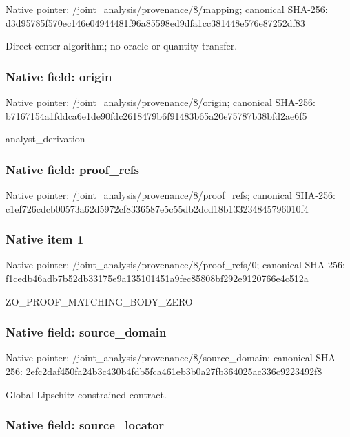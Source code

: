 \documentclass[10pt,a4paper]{article}
\begin{document}
Native pointer: /joint\_analysis/provenance/8/mapping; canonical SHA-256: d3d95785f570ec146e049444\allowbreak{}81f96a85598ed9dfa1cc3814\allowbreak{}48e576e87252df83


Direct center algorithm; no oracle or quantity transfer.


\subsubsection{Native field: origin}


Native pointer: /joint\_analysis/provenance/8/origin; canonical SHA-256: b7167154a1fddca6e1de90fd\allowbreak{}c2618479b6f91483b65a20e7\allowbreak{}5787b38bfd2ae6f5


analyst\_derivation


\subsubsection{Native field: proof\_refs}


Native pointer: /joint\_analysis/provenance/8/proof\_refs; canonical SHA-256: c1ef726cdcb00573a62d5972\allowbreak{}cf8336587e5c55db2dcd18b1\allowbreak{}33234845796010f4



\subsubsection{Native item 1}


Native pointer: /joint\_analysis/provenan\allowbreak{}ce/8/proof\_refs/0; canonical SHA-256: f1cedb46adb7b52db33175e9\allowbreak{}a135101451a9fec85808bf29\allowbreak{}2e9120766e4c512a


ZO\_PROOF\_MATCHING\_BODY\_ZERO


\subsubsection{Native field: source\_domain}


Native pointer: /joint\_analysis/provenan\allowbreak{}ce/8/source\_domain; canonical SHA-256: 2efc2daf450fa24b3c430b4f\allowbreak{}db5fca461eb3b0a27fb36402\allowbreak{}5ac336c9223492f8


Global Lipschitz constrained contract.


\subsubsection{Native field: source\_locator}
\end{document}
